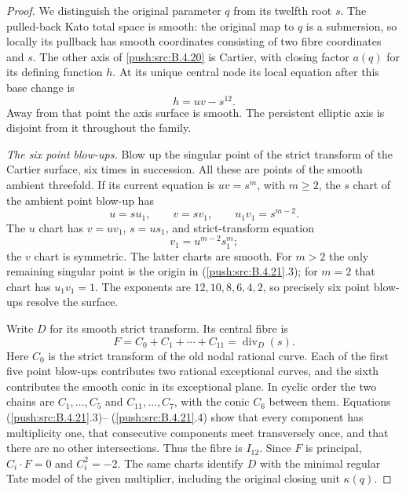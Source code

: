 \begin{proof}
We distinguish the original parameter $q$ from its twelfth root
$s$.  The pulled-back Kato total space is smooth: the original
map to $q$ is a submersion, so locally its pullback has smooth
coordinates consisting of two fibre coordinates and $s$.
The other axis of \ref{push:src:B.4.20} is Cartier, with closing factor $a(q)$
for its defining function $h$.  At its unique central node its
local equation after this base change is
\[
 h=uv-s^{12}.
 \tag{B.4.21.2}
\]
Away from that point the axis surface is smooth.  The persistent
elliptic axis is disjoint from it throughout the family.

\emph{The six point blow-ups.}
Blow up the singular point of the strict transform of the
Cartier surface, six times in succession.  All these are points
of the smooth ambient threefold.  If its current equation is
$uv=s^m$, with $m\ge2$, the $s$ chart of the ambient point
blow-up has
\[
 u=su_1,\qquad v=sv_1,
 \qquad u_1v_1=s^{m-2}.
 \tag{B.4.21.3}
\]
The $u$ chart has $v=uv_1$, $s=us_1$, and strict-transform
equation
\[
 v_1=u^{m-2}s_1^m;
 \tag{B.4.21.4}
\]
the $v$ chart is symmetric.  The latter charts are smooth.
For $m>2$ the only remaining singular point is the origin in
(\ref{push:src:B.4.21}.3); for $m=2$ that chart has $u_1v_1=1$.
The exponents are $12,10,8,6,4,2$, so precisely six point
blow-ups resolve the surface.

Write $D$ for its smooth strict transform.  Its central fibre is
\[
 F=C_0+C_1+\cdots+C_{11}=\operatorname{div}_D(s).
 \tag{B.4.21.5}
\]
Here $C_0$ is the strict transform of the old nodal rational
curve.  Each of the first five point blow-ups contributes two
rational exceptional curves, and the sixth contributes the
smooth conic in its exceptional plane.  In cyclic order the
two chains are $C_1,\ldots,C_5$ and $C_{11},\ldots,C_7$, with
the conic $C_6$ between them.  Equations (\ref{push:src:B.4.21}.3)--
(\ref{push:src:B.4.21}.4) show that every component has multiplicity one,
that consecutive components meet transversely once, and that
there are no other intersections.  Thus the fibre is $I_{12}$.
Since $F$ is principal, $C_i\cdot F=0$ and $C_i^2=-2$.
The same charts identify $D$ with the minimal regular Tate
model of the given multiplier, including the original closing
unit $\kappa(q)$.


\end{proof}
